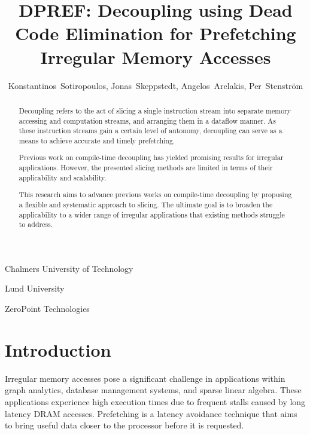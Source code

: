 \documentclass{acaces}
\begin{document}
\title{DPREF: Decoupling using Dead Code Elimination for Prefetching Irregular Memory Accesses}

\author{
Konstantinos~Sotiropoulos\comma{},
Jonas~Skeppstedt\comma{},
Angelos~Arelakis\comma{},
Per~Stenstr\"{o}m\comma{}
}

\address{1}{
  Chalmers University of Technology
}

\address{2}{
  Lund University
}

\address{3}{
  ZeroPoint Technologies
}


\pagestyle{empty}

\begin{abstract}

  Decoupling refers to the act of slicing a single instruction stream into separate memory accessing and computation streams, and arranging them in a dataflow manner.
  As these instruction streams gain a certain level of autonomy, decoupling can serve as a means to achieve accurate and timely prefetching.

  Previous work on compile-time decoupling has yielded promising results for irregular applications.
  However, the presented slicing methods are limited in terms of their applicability and scalability.

  This research aims to advance previous works on compile-time decoupling by proposing a flexible and systematic approach to slicing.
  The ultimate goal is to broaden the applicability to a wider range of irregular applications that existing methods struggle to address. \\

\end{abstract}


\section{Introduction}

Irregular memory accesses pose a significant challenge in applications within graph analytics, database management systems, and sparse linear algebra.
These applications experience high execution times due to frequent stalls caused by long latency DRAM accesses.
Prefetching is a latency avoidance technique that aims to bring useful data closer to the processor before it is requested.
\end{document}
